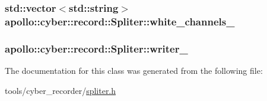 \hypertarget{classapollo_1_1cyber_1_1record_1_1Spliter_a292e3b4cad0f53665ed2b770b45dd3f1}{
\subsubsection[{white\-\_\-channels\-\_\-}]{\setlength{\rightskip}{0pt plus 5cm}std\-::vector$<$std\-::string$>$ apollo\-::cyber\-::record\-::\-Spliter\-::white\-\_\-channels\-\_\-\hspace{0.3cm}{\ttfamily [private]}}}\label{classapollo_1_1cyber_1_1record_1_1Spliter_a292e3b4cad0f53665ed2b770b45dd3f1}
\hypertarget{classapollo_1_1cyber_1_1record_1_1Spliter_a5e54bcc255461637063eb009d996eb13}{
\subsubsection[{writer\-\_\-}]{ apollo\-::cyber\-::record\-::\-Spliter\-::writer\-\_\-\hspace{0.3cm}{\ttfamily [private]}}}\label{classapollo_1_1cyber_1_1record_1_1Spliter_a5e54bcc255461637063eb009d996eb13}


The documentation for this class was generated from the following file\-:\begin{DoxyCompactItemize}
\item 
tools/cyber\-\_\-recorder/\hyperlink{spliter_8h}{spliter.\-h}\end{DoxyCompactItemize}
